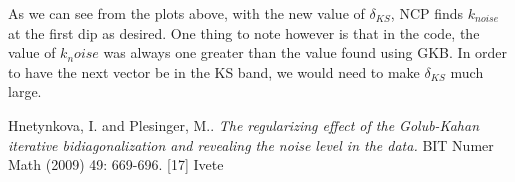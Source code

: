 \documentclass[11pt]{amsart}
\begin{document}
As we can see from the plots above, with the new value of $\delta_{KS}$, NCP finds $k_{noise}$
at the first dip as desired. One thing to note however is that in the code, the value of $k_noise$
was always one greater than the value found using GKB. In order to have the next vector be in the
KS band, we would need to make $\delta_{KS}$ much large.

\begin{thebibliography}{1}
    Hnetynkova, I. and Plesinger, M.. 
    \emph{The regularizing effect of the Golub-Kahan iterative bidiagonalization 
      and revealing the noise level in the data.}
      BIT Numer Math (2009) 49: 669-696.
     [17] Ivete
\end{thebibliography}
\end{document}
